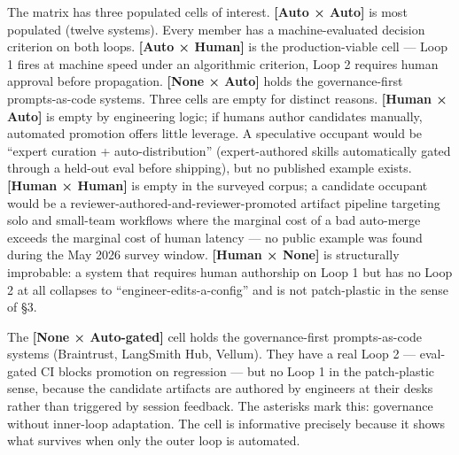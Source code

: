 \documentclass[
]{article}
\begin{document}
The matrix has three populated cells of interest. \textbf{{[}Auto ×
Auto{]}} is most populated (twelve systems). Every member has a
machine-evaluated decision criterion on both loops. \textbf{{[}Auto ×
Human{]}} is the production-viable cell --- Loop 1 fires at machine
speed under an algorithmic criterion, Loop 2 requires human approval
before propagation. \textbf{{[}None × Auto{]}} holds the
governance-first prompts-as-code systems. Three cells are empty for
distinct reasons. \textbf{{[}Human × Auto{]}} is empty by engineering
logic; if humans author candidates manually, automated promotion offers
little leverage. A speculative occupant would be ``expert curation +
auto-distribution'' (expert-authored skills automatically gated through
a held-out eval before shipping), but no published example exists.
\textbf{{[}Human × Human{]}} is empty in the surveyed corpus; a
candidate occupant would be a reviewer-authored-and-reviewer-promoted
artifact pipeline targeting solo and small-team workflows where the
marginal cost of a bad auto-merge exceeds the marginal cost of human
latency --- no public example was found during the May 2026 survey
window. \textbf{{[}Human × None{]}} is structurally improbable: a system
that requires human authorship on Loop 1 but has no Loop 2 at all
collapses to ``engineer-edits-a-config'' and is not patch-plastic in the
sense of §3.

The \textbf{{[}None × Auto-gated{]}} cell holds the governance-first
prompts-as-code systems (Braintrust, LangSmith Hub, Vellum). They have a
real Loop 2 --- eval-gated CI blocks promotion on regression --- but no
Loop 1 in the patch-plastic sense, because the candidate artifacts are
authored by engineers at their desks rather than triggered by session
feedback. The asterisks mark this: governance without inner-loop
adaptation. The cell is informative precisely because it shows what
survives when only the outer loop is automated.
\end{document}
